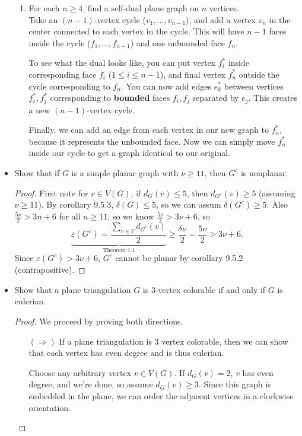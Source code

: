 \documentclass[11pt]{article}
\newcommand\itm[1]{\item[\textbf{#1}]}
\newcommand{\n}{\vspace{0.2cm}}
\begin{document}
\begin{itemize}
\begin{enumerate}[label=(\alph*)]
    \item For each \(n \geq 4\), find a self-dual plane graph on \(n\) vertices. \n\\
      Take an \((n-1)\)-vertex cycle (\(v_1, \hdots, v_{n-1}\)), and add a vertex \(v_n\) in the center connected to each vertex in the cycle. This will have \(n-1\) faces inside the cycle (\(f_1, \hdots, f_{n-1}\)) and one unbounded face \(f_n\). \n

      To see what the dual looks like, you can put vertex \(f_i^*\) inside corresponding face \(f_i\) (\(1 \leq i\leq n-1\)), and final vertex \(f_n^*\) outside the cycle corresponding to \(f_n\).  You can now add edges \(e_k^*\) between vertices \(f_i^*,f_j^*\) corresponding to \textbf{bounded} faces \(f_i,f_j\) separated by \(e_j\).  This creates a new \((n-1)\)-vertex cycle. \n
      
      Finally, we can add an edge from each vertex in our new graph to \(f_n^*\), because it represents the unbounded face.  Now we can simply move \(f_n^*\) inside our cycle to get a graph identical to our original.
  \end{enumerate} \n


  \itm{9.3.3(a)} Show that if \(G\) is a simple planar graph with \(\nu \geq 11\), then \(G^c\) is nonplanar.
    \begin{proof}
      First note for \(v \in V(G)\), if \(d_G(v) \leq 5\), then \(d_{G^c}(v) \geq 5\) (assuming \(\nu \geq 11\)).  By corollary 9.5.3, \(\delta(G) \leq 5\), so we can assum \(\delta(G^c) \geq 5\).   Also \(\frac{5\nu}{2} > 3n + 6\) for all \(n \geq 11\), so we know \(\frac{5\nu}{2} > 3\nu + 6\), so
      \[\underbrace{\varepsilon(G^c) = \frac{\sum_{v \in V} d_{G^c}(v)}2}_{\text{Theorem 1.1}} \geq \frac{\delta\nu}2 = \frac{5\nu}2 > 3\nu + 6.\]
      Since \(\varepsilon(G^c) > 3\nu + 6\), \(G^c\) cannot be planar by corollary 9.5.2 (contrapositive).
    \end{proof}
    \newpage


  \itm{9.6.2} Show that a plane triangulation \(G\) is 3-vertex colorable if and only if \(G\) is eulerian.
  \begin{proof}
    We proceed by proving both directions.
    \begin{enumerate}
      \item[\((\Rightarrow)\)] If a plane triangulation is 3 vertex colorable, then we can show that each vertex has even degree and is thus eulerian. \n

        Choose any arbitrary vertex \(v \in V(G)\).  If \(d_G(v) = 2\), \(v\) has even degree, and we're done, so assume \(d_G(v) \geq 3\).  Since this graph is embedded in the plane, we can order the adjacent vertices in a clockwise orientation. \n


\end{enumerate}
\end{proof}
\end{itemize}
\end{document}
